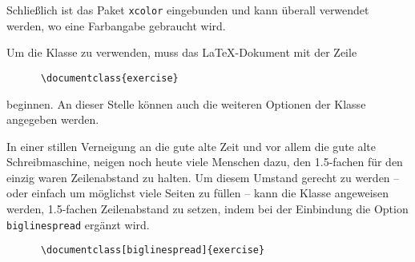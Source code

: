\documentclass{exercise}
\begin{document}
    Schließlich ist das Paket \texttt{xcolor} \cite{xcolor} eingebunden und kann überall verwendet werden, wo eine Farbangabe gebraucht wird.
    
    Um die Klasse zu verwenden, muss das \LaTeX{}-Dokument mit der Zeile
    \begin{verbatim}
      \documentclass{exercise}
    \end{verbatim} 
    beginnen. An dieser Stelle können auch die weiteren Optionen der Klasse angegeben werden.
    
    In einer stillen Verneigung an die gute alte Zeit und vor allem die gute alte Schreibmaschine, neigen noch heute viele Menschen dazu, den 1.5-fachen für den einzig waren Zeilenabstand zu halten. Um diesem Umstand gerecht zu werden -- oder einfach um möglichst viele Seiten zu füllen -- kann die Klasse angeweisen werden, 1.5-fachen Zeilenabstand zu setzen, indem bei der Einbindung die Option \texttt{biglinespread} ergänzt wird.
    \begin{verbatim}
      \documentclass[biglinespread]{exercise}
    \end{verbatim} 
    
\end{document}

